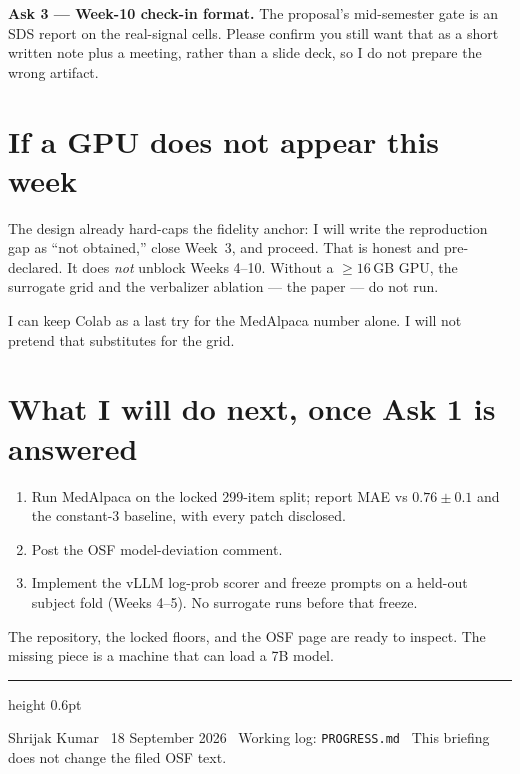 \documentclass[11pt]{article}
\begin{document}
\vspace{0.3em}
{\color{Ask}\textbf{Ask 3 --- Week-10 check-in format.}}
The proposal's mid-semester gate is an SDS report on the real-signal cells. Please confirm you still want that as a short written note plus a meeting, rather than a slide deck, so I do not prepare the wrong artifact.

\section{If a GPU does not appear this week}

The design already hard-caps the fidelity anchor: I will write the reproduction gap as ``not obtained,'' close Week~3, and proceed. That is honest and pre-declared. It does \emph{not} unblock Weeks 4--10. Without a ${\ge}16$\,GB GPU, the surrogate grid and the verbalizer ablation --- the paper --- do not run.

I can keep Colab as a last try for the MedAlpaca number alone. I will not pretend that substitutes for the grid.

\section{What I will do next, once Ask 1 is answered}

\begin{enumerate}\setlength{\itemsep}{0.15em}
  \item Run MedAlpaca on the locked 299-item split; report MAE vs $0.76\pm 0.1$ and the constant-3 baseline, with every patch disclosed.
  \item Post the OSF model-deviation comment.
  \item Implement the vLLM log-prob scorer and freeze prompts on a held-out subject fold (Weeks 4--5). No surrogate runs before that freeze.
\end{enumerate}

The repository, the locked floors, and the OSF page are ready to inspect. The missing piece is a machine that can load a 7B model.

\vspace{0.7em}
{\color{Accent}\hrule height 0.6pt}
\vspace{0.35em}
{\small\color{AccentSoft}
Shrijak Kumar \textbullet\ 18 September 2026 \textbullet\
Working log: \texttt{PROGRESS.md} \textbullet\
This briefing does not change the filed OSF text.
\par}
\end{document}
